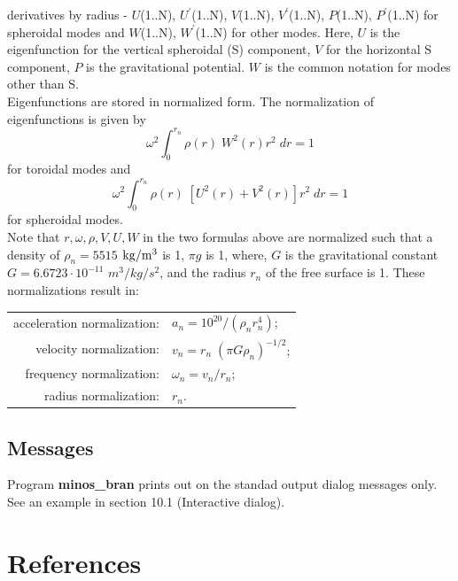\documentclass[11pt]{article}
\begin{document}
derivatives by radius - 
$U$(1..N), $U^\prime$(1..N), $V$(1..N), $V^\prime$(1..N),
$P$(1..N), $P^\prime$(1..N) for spheroidal modes and
$W$(1..N), $W^\prime$(1..N)
for other modes. Here, $U$ is the eigenfunction for the vertical spheroidal (S) component,
$V$ for the horizontal S component, $P$ is the gravitational potential. $W$ is the
common notation for modes other than S.\\
Eigenfunctions are stored in normalized form.
The normalization of eigenfunctions is given by 
\[       \omega^2 \int_0^{r_n} \rho(r)\; W^{2}(r)r^{2}\;dr = 1 \]
for toroidal modes and
\[       \omega^2 \int_0^{r_n} \rho(r)\; [U^{2}(r)+V^{2}(r)]r^{2}\;dr = 1 \]
for spheroidal modes. \\
Note that $r, \omega, \rho, V, U, W$ in the two formulas above are normalized such 
that a density of $\rho_n=5515$ $\rm kg/m^3$ is 1,
$\pi g$ is 1, where, $G$ is the gravitational constant $G=6.6723\cdot 10^{-11}$
$m^{3}/kg/s^2$, 
and the radius $r_n$ of the free surface is 1. These normalizations result in:
\begin{center}
\begin{tabular}{rl}
acceleration normalization: & $a_n=10^{20}/(\rho_n r_n^4)$; \\
velocity normalization:     & $v_n=r_n\;(\pi G\rho_n)^{-1/2}$; \\
frequency normalization:    & $\omega_n=v_n/r_n$; \\
radius normalization:       & $r_n$. \\
\end{tabular}
\end{center}

\subsection {Messages}
Program {\bf minos\_bran} prints out on the standad output dialog
messages only. See an example in section 10.1 (Interactive dialog).









\section* {References}
\end{document}
